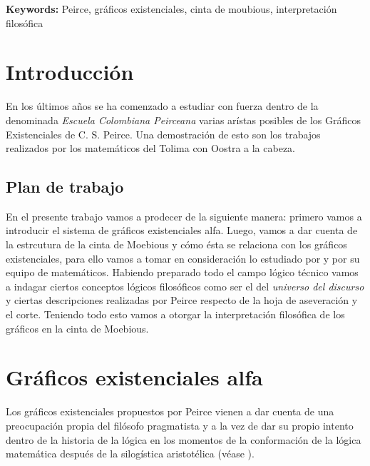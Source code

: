\documentclass[
	fontsize=10pt, %
	twoside=false, %
	secnumdepth=1, %
	abstract=true, %
]{kaohandt}
\begin{document}
{\noindent\textbf{Keywords:} Peirce, gráficos existenciales, cinta de moubious, interpretación filosófica}

\medskip


\section{Introducción}
\label{sec:Introducción}

En los últimos años se ha comenzado a estudiar con fuerza dentro de la denominada \textit{Escuela Colombiana Peirceana} varias arístas posibles de los Gráficos Existenciales de C. S. Peirce. Una demostración de esto son los trabajos realizados por los matemáticos del Tolima con Oostra a la cabeza.

\subsection{Plan de trabajo} %
\label{sub:Plan de trabajo}
En el presente trabajo vamos a prodecer de la siguiente manera: primero vamos a introducir el sistema de gráficos existenciales alfa. Luego, vamos a dar cuenta de la estrcutura de la cinta de Moebious y cómo ésta se relaciona con los gráficos existenciales, para ello vamos a tomar en consideración lo estudiado por \cite{oostra2023} y por su equipo de matemáticos. Habiendo preparado todo el campo lógico técnico vamos a indagar ciertos conceptos lógicos filosóficos como ser el del \textit{universo del discurso} y ciertas descripciones realizadas por Peirce respecto de la hoja de aseveración y el corte. Teniendo todo esto vamos a otorgar la interpretación filosófica de los gráficos en la cinta de Moebious.



\section{Gráficos existenciales alfa}

Los gráficos existenciales propuestos por Peirce vienen a dar cuenta de una preocupación propia del filósofo pragmatista y a la vez de dar su propio intento dentro de la historia de la lógica en los momentos de la conformación de la lógica matemática después de la silogística aristotélica (véase \cite{brady2011}).
\end{document}
